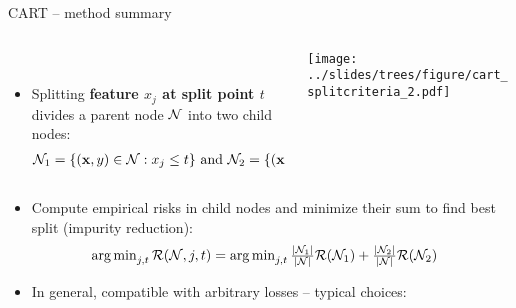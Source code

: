 \begin{frame}{CART -- method summary}

\footnotesize

\begin{columns}[T, totalwidth=\linewidth]
    \begin{column}{0.6\linewidth}
    
 \\
    \begin{itemize}
\item Splitting \textbf{feature $x_j$ at split point $t$} divides a parent node $\mathcal{N}$ into two child nodes:
 \begin{align*}\mathcal{N}_1 = \{ (\mathbf{x}, y) \in \mathcal{N}: x_j \leq t \} \text{ and } \mathcal{N}_2 = \{ (\mathbf{x}, y) \in \mathcal{N}: x_j > t \}
      \end{align*}
  
\end{itemize}
    \end{column}
    \begin{column}{0.4\linewidth}
{\centering \texttt{[image: ../slides/trees/figure/cart\_splitcriteria\_2.pdf]} 
}
\end{column}
\end{columns}
\begin{itemize}
  \item Compute empirical risks in child nodes and minimize their sum to find best split (impurity reduction):
     \begin{align*}
      \operatorname{arg\,min}_{j, t} \mathcal{R}(\mathcal{N}, j, t) &= \operatorname{arg\,min}_{j, t} \tfrac{|\mathcal{N}_1|}{|\mathcal{N}|} \mathcal{R}(\mathcal{N}_1) + \tfrac{|\mathcal{N}_2|}{|\mathcal{N}|} \mathcal{R}(\mathcal{N}_2)
      \end{align*}
      
  \item In general, compatible with arbitrary losses -- typical choices:
  \begin{itemize}
    \footnotesize


\end{itemize}
\end{itemize}
\end{frame}

